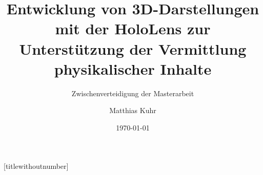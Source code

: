 \documentclass{beamer}
\title{Entwicklung von 3D-Darstellungen mit der HoloLens zur Unterstützung der Vermittlung physikalischer Inhalte}
\subtitle{Zwischenverteidigung der Masterarbeit}
\author{Matthias Kuhr}
\date{\today}
\begin{document}
{
	[titlewithoutnumber] %
	\maketitle
}


%



\end{document}
